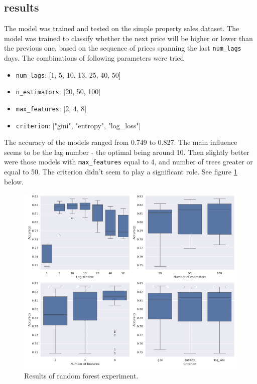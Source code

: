 \subsection{results}
The model was trained and tested on the simple property sales dataset.
The model was trained to classify whether the next price will be higher or lower than the previous one, based on the sequence of prices spanning the last \verb|num_lags| days.
The combinations of following parameters were tried

\noindent
\begin{itemize}
	\item \verb|num_lags|: [1, 5, 10, 13, 25, 40, 50]
	\item \verb|n_estimators|: [20, 50, 100]
	\item \verb|max_features|: [2, 4, 8]
	\item \verb|criterion|: ["gini", "entropy", "log\_loss"]
\end{itemize}

The accuracy of the models ranged from 0.749 to 0.827. The main influence seems to be the lag number - the optimal being around 10. Then slightly better were those models with \verb|max_features| equal to 4, and number of trees greater or equal to 50. The criterion didn't seem to play a significant role. See figure \ref{fig:random_forest_fig} below.

\begin{figure}[h!]
	\includegraphics[width=\linewidth]{"pictures/random_forest_results.png"}
	\caption{Results of random forest experiment.}
	\label{fig:random_forest_fig}
\end{figure}















